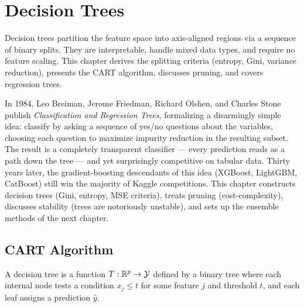 \chapter{Decision Trees}\label{ch:trees}

\begin{intuition}[title=\textbf{Chapter Overview}]
Decision trees partition the feature space into axis-aligned regions via a sequence of binary splits. They are interpretable, handle mixed data types, and require no feature scaling. This chapter derives the splitting criteria (entropy, Gini, variance reduction), presents the CART algorithm, discusses pruning, and covers regression trees.
\end{intuition}

In 1984, Leo Breiman, Jerome Friedman, Richard Olshen, and Charles Stone publish \emph{Classification and Regression Trees}, formalizing a disarmingly simple idea: classify by asking a sequence of yes/no questions about the variables, choosing each question to maximize impurity reduction in the resulting subset. The result is a completely transparent classifier --- every prediction reads as a path down the tree --- and yet surprisingly competitive on tabular data. Thirty years later, the gradient-boosting descendants of this idea (XGBoost, LightGBM, CatBoost) still win the majority of Kaggle competitions. This chapter constructs decision trees (Gini, entropy, MSE criteria), treats pruning (cost-complexity), discusses stability (trees are notoriously unstable), and sets up the ensemble methods of the next chapter.

\section{CART Algorithm}

\begin{definition}
A decision tree is a function $T : \mathbb{R}^p \to \mathcal{Y}$ defined by a binary tree where each internal node tests a condition $x_j \leq t$ for some feature $j$ and threshold $t$, and each leaf assigns a prediction $\hat{y}$.
\end{definition}

